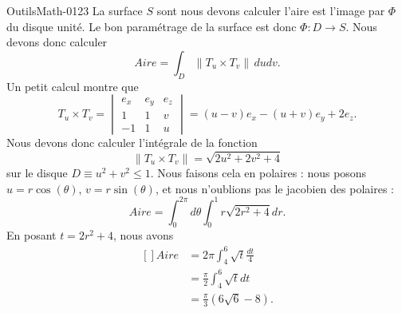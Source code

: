 \begin{corrige}{OutilsMath-0123}
    La surface \( S\) sont nous devons calculer l'aire est l'image par \( \Phi\) du disque unité. Le bon paramétrage de la surface est donc \( \Phi\colon D\to S\). Nous devons donc calculer
    \begin{equation}
        Aire=\int_D\| T_u\times T_v \|\,dudv.
    \end{equation}
    Un petit calcul montre que
    \begin{equation}
        T_u\times T_v=\begin{vmatrix}
            e_x    &   e_y    &   e_z    \\
            1    &   1    &   v    \\
            -1    &   1    &   u
        \end{vmatrix}=(u-v)e_x-(u+v)e_y+2e_z.
    \end{equation}
    Nous devons donc calculer l'intégrale de la fonction
    \begin{equation}
        \| T_u\times T_v \|=\sqrt{2u^2+2v^2+4}
    \end{equation}
    sur le disque \( D\equiv u^2+v^2\leq 1\). Nous faisons cela en polaires : nous posons \( u=r\cos(\theta)\), \( v=r\sin(\theta)\), et nous n'oublions pas le jacobien des polaires :
    \begin{equation}
        Aire=\int_0^{2\pi}d\theta\int_0^1r\sqrt{2r^2+4}dr.
    \end{equation}
    En posant \( t=2r^2+4\), nous avons
    \begin{equation}
        \begin{aligned}[]
            Aire&=2\pi\int_4^6\sqrt{t}\frac{ dt }{ 4 }\\
            &=\frac{ \pi }{2}\int_4^6\sqrt{t}dt\\
            &=\frac{ \pi }{ 3 }(6\sqrt{6}-8).
        \end{aligned}
    \end{equation}

\end{corrige}
